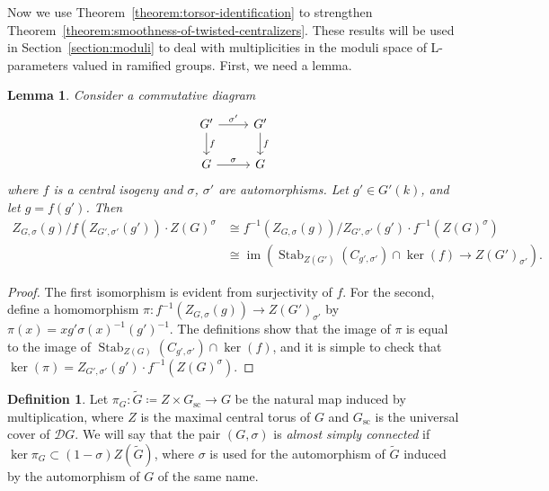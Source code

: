 \documentclass[11pt,reqno]{amsart}
\newtheorem{lemma}[theorem]{Lemma}
\theoremstyle{definition}
\newtheorem{definition}[theorem]{Definition}
\newcommand{\sD}{{\mathscr D}}
\DeclareMathOperator{\im}{im}
\DeclareMathOperator{\Stab}{Stab}
\begin{document}

Now we use Theorem~\ref{theorem:torsor-identification} to strengthen Theorem~\ref{theorem:smoothness-of-twisted-centralizers}. These results will be used in Section~\ref{section:moduli} to deal with multiplicities in the moduli space of L-parameters valued in ramified groups. First, we need a lemma.

\begin{lemma}\label{lemma:twisted-centralizer-isogeny}
    Consider a commutative diagram
    \[
    \begin{tikzcd}
        G' \arrow[r, "\sigma'"] \arrow[d, "f"]
            &G' \arrow[d, "f"] \\
        G \arrow[r, "\sigma"]
            &G
    \end{tikzcd}
    \]
    where $f$ is a central isogeny and $\sigma$, $\sigma'$ are automorphisms. Let $g' \in G'(k)$, and let $g = f(g')$. Then
    \begin{align*}
    Z_{G,\sigma}(g)/f(Z_{G',\sigma'}(g')) \cdot Z(G)^\sigma
    &\cong f^{-1}(Z_{G,\sigma}(g))/Z_{G',\sigma'}(g') \cdot f^{-1}(Z(G)^\sigma) \\
    &\cong \im(\Stab_{Z(G')}(C_{g', \sigma'}) \cap \ker(f) \to Z(G')_{\sigma'}).
    \end{align*}
\end{lemma}

\begin{proof}
    The first isomorphism is evident from surjectivity of $f$. For the second, define a homomorphism $\pi\colon f^{-1}(Z_{G,\sigma}(g)) \to Z(G')_{\sigma'}$ by $\pi(x) = xg'\sigma(x)^{-1}(g')^{-1}$. The definitions show that the image of $\pi$ is equal to the image of $\Stab_{Z(G)}(C_{g', \sigma'}) \cap \ker(f)$, and it is simple to check that $\ker(\pi) = Z_{G',\sigma'}(g') \cdot f^{-1}(Z(G)^\sigma)$.
\end{proof}

\begin{definition}\label{def:almost-simply-connected}
    Let $\pi_G\colon \widetilde{G} \coloneqq Z \times G_{\mathrm{sc}} \to G$ be the natural map induced by multiplication, where $Z$ is the maximal central torus of $G$ and $G_{\mathrm{sc}}$ is the universal cover of $\sD G$. We will say that the pair $(G, \sigma)$ is \textit{almost simply connected} if $\ker \pi_G \subset (1-\sigma)Z(\widetilde{G})$, where $\sigma$ is used for the automorphism of $\widetilde{G}$ induced by the automorphism of $G$ of the same name.
\end{definition}
\end{document}
